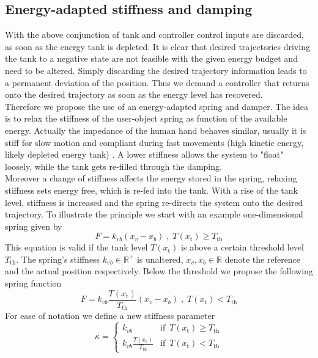 \documentclass[a4paper,twoside, openright,12pt]{report}
\newcommand{\g}[1]{\text{#1}}
\begin{document}
{\subsection{Energy-adapted stiffness and damping}\label{SS:EnergyAdaptedStiffness}
With the above conjunction of tank and controller control inputs are discarded, as soon as the energy tank is depleted. It is clear that desired trajectories driving the tank to a negative state are not feasible with the given energy budget and need to be altered. Simply discarding the desired trajectory information leads to a permanent deviation of the position. Thus we demand a controller that returns onto the desired trajectory as soon as the energy level has recovered.\\ Therefore we propose the use of an energy-adapted spring and damper. The idea is to relax the stiffness of the user-object spring as function of the available energy. Actually the impedance of the human hand behaves similar, usually it is stiff for slow motion and compliant during fast movements (high kinetic energy, likely depleted energy tank) \cite{Hogan_84b}. A lower stiffness allows the system to "float" loosely, while the tank gets re-filled through the damping.\\ Moreover a change of stiffness affects the energy stored in the spring, relaxing stiffness sets energy free, which is re-fed into the tank. With a rise of the tank level, stiffness is increased and the spring re-directs the system onto the desired trajectory. To illustrate the principle we start with an example one-dimensional spring given by
\begin{equation}
F = k_{vb}(x_v-x_b) \;,\; T(x_\g{t})\geq T_{\g{th}}
\end{equation}
This equation is valid if the tank level $T(x_\g{t})$ is above a certain threshold level $T_{\g{th}}$. The spring's stiffness $k_{vb} \in \mathbb{R}^+$ is unaltered, $x_v, x_b \in \mathbb{R}$ denote the reference and the actual position respectively. Below the threshold we propose the following spring function
\begin{equation}
F = k_{vb}\frac{T(x_\g{t})}{T_{\g{th}}}(x_v-x_b) \;,\; T(x_\g{t})<T_{\g{th}}
\end{equation}
For ease of notation we define a new stiffness parameter
\begin{equation}
\kappa = \begin{cases}
k_{vb} & \text{if } \, T(x_\g{t})\geq T_{\g{th}} \\
k_{vb} \frac{T(x_\g{t})}{T_{\g{th}}} & \text{if } \, T(x_\g{t}) < T_{\g{th}}

\end{cases}
\end{equation}}
\end{document}
